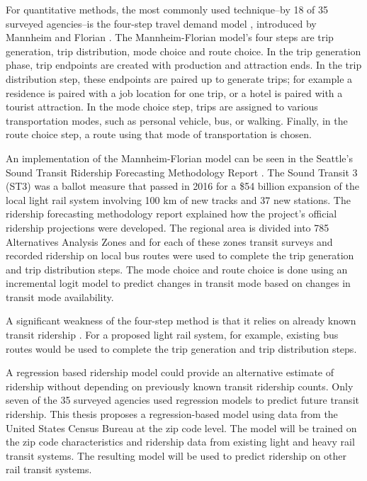 \documentclass[11pt]{article}
\begin{document}
For quantitative methods, the most commonly used technique--by 18 of 35 surveyed agencies--is the four-step travel demand model \cite{McNally2008}, introduced by Mannheim and Florian \cite{Mannheim1979, Florian1988}. The Mannheim-Florian model's four steps are trip generation, trip distribution, mode choice and route choice. In the trip generation phase, trip endpoints are created with production and attraction ends. In the trip distribution step, these endpoints are paired up to generate trips; for example a residence is paired with a job location for one trip, or a hotel is paired with a tourist attraction. In the mode choice step, trips are assigned to various transportation modes, such as personal vehicle, bus, or walking. Finally, in the route choice step, a route using that mode of transportation is chosen.

An implementation of the Mannheim-Florian model can be seen in the Seattle's Sound Transit Ridership Forecasting Methodology Report \cite{ST3_2015, ST3_add}. The Sound Transit 3 (ST3) was a ballot measure that passed in 2016 for a \$54 billion expansion of the local light rail system involving 100 km of new tracks and 37 new stations. The ridership forecasting methodology report explained how the project's official ridership projections were developed. The regional area is divided into 785 Alternatives Analysis Zones and for each of these zones transit surveys and recorded ridership on local bus routes were used to complete the trip generation and trip distribution steps. The mode choice and route choice is done using an incremental logit model to predict changes in transit mode based on changes in transit mode availability.

A significant weakness of the four-step method is that it relies on already known transit ridership \cite{NCTR}. For a proposed light rail system, for example, existing bus routes would be used to complete the trip generation and trip distribution steps.

A regression based ridership model could provide an alternative estimate of ridership without depending on previously known transit ridership counts. Only seven of the 35 surveyed agencies used regression models to predict future transit ridership. This thesis proposes a regression-based model using data from the United States Census Bureau at the zip code level. The model will be trained on the zip code characteristics and ridership data from existing light and heavy rail transit systems. The resulting model will be used to predict ridership on other rail transit systems.  
\end{document}
